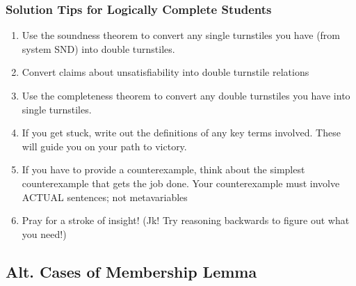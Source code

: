 \begin{frame}
\frametitle{Solution Tips for Logically Complete Students}

\begin{enumerate}

\item Use the soundness theorem to convert any single turnstiles you have (from system SND) into double turnstiles.

\item Convert claims about unsatisfiability into double turnstile relations

\item Use the completeness theorem to convert any double turnstiles you have into single turnstiles.

\item If you get stuck, write out the definitions of any key terms involved. These will guide you on your path to victory.

\item If you have to provide a counterexample, think about the simplest counterexample that gets the job done. Your counterexample must involve ACTUAL sentences; not metavariables

\item Pray for a stroke of insight! (Jk! Try reasoning backwards to figure out what you need!)

\end{enumerate}
\end{frame}



\subsection{Alt. Cases of Membership Lemma}

